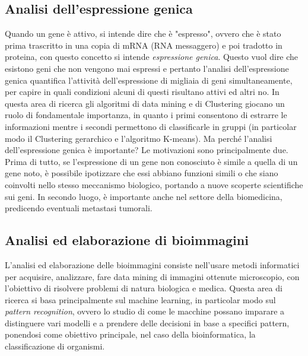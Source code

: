 \subsection{Analisi dell'espressione genica}
Quando un gene è attivo, si intende dire che è "espresso", ovvero che è stato prima trascritto in una copia di mRNA (RNA messaggero) e poi tradotto in proteina, con questo concetto si intende \textit{espressione genica}. Questo vuol dire che esistono geni che non vengono mai espressi e pertanto l'analisi dell'espressione genica quantifica l'attività dell'espressione di migliaia di geni simultaneamente, per capire in quali condizioni alcuni di questi risultano attivi ed altri no.
\newline
In questa area di ricerca gli algoritmi di data mining e di Clustering giocano un ruolo di fondamentale importanza, in quanto i primi consentono di estrarre le informazioni mentre i secondi permettono di classificarle in gruppi (in particolar modo il Clustering gerarchico e l'algoritmo K-means).
\newline
Ma perché l'analisi dell'espressione genica è importante? Le motivazioni sono principalmente due. Prima di tutto, se l'espressione di un gene non conosciuto è simile a quella di un gene noto, è possibile ipotizzare che essi abbiano funzioni simili o che siano coinvolti nello stesso meccanismo biologico, portando a nuove scoperte scientifiche sui geni. In secondo luogo, è importante anche nel settore della biomedicina, predicendo eventuali metastasi tumorali.

\subsection{Analisi ed elaborazione di bioimmagini}
L'analisi ed elaborazione delle bioimmagini consiste nell'usare metodi informatici per acquisire, analizzare, fare data mining di immagini ottenute microscopio, con l'obiettivo di risolvere problemi di natura biologica e medica.
Questa area di ricerca si basa principalmente sul machine learning, in particolar modo sul \textit{pattern recognition}, ovvero lo studio di come le macchine possano imparare a distinguere vari modelli e a prendere delle decisioni in base a specifici pattern, ponendosi come obiettivo principale, nel caso della bioinformatica, la classificazione di organismi.

